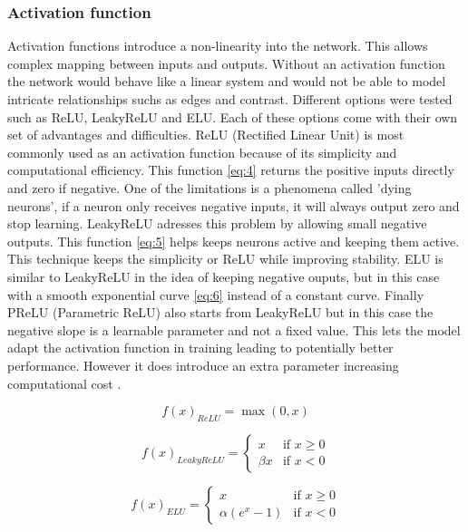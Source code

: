 \documentclass[twocolumn]{article}
\begin{document}
\subsubsection{Activation function}
Activation functions introduce a non-linearity into the network. This allows complex mapping between inputs and outputs. 
Without an activation function the network would behave like a linear system and would not be able to model intricate relationships suchs as edges and contrast. 
Different options were tested such as ReLU,  LeakyReLU and ELU. Each of these options come with their own set of advantages and difficulties. 
ReLU (Rectified Linear Unit) is most commonly used as an activation function because of its simplicity and computational efficiency. 
This function \ref{eq:4} returns the positive inputs directly and zero if negative. One of the limitations is a phenomena called 'dying neurons',  if a neuron only receives negative inputs, it will always output zero and stop learning.
LeakyReLU adresses this problem by allowing small negative outputs. This function \ref{eq:5} helps keeps neurons active and keeping them active. 
This technique keeps the simplicity or ReLU while improving stability. 
ELU is similar to LeakyReLU in the idea of keeping negative ouputs, but in this case with a smooth exponential curve \ref{eq:6}  instead of a constant curve. 
Finally PReLU (Parametric ReLU) also starts from LeakyReLU but in this case the negative slope is a learnable parameter and not a fixed value. 
This lets the model adapt the activation function in training leading to potentially better performance. 
However it does introduce an extra parameter increasing computational cost \cite{bharatiya_2019_comprehensive}.

\begin{equation}\label{eq:4}
    f(x)_{ReLU} = \max(0, x)
\end{equation}

\begin{equation}\label{eq:5}
f(x)_{LeakyReLU} = 
\begin{cases}
x & \text{if } x \geq 0 \\
\beta x & \text{if } x < 0
\end{cases}
\end{equation}

\begin{equation}\label{eq:6}
f(x)_{ELU} = 
\begin{cases}
x & \text{if } x \geq 0 \\
\alpha (e^x - 1) & \text{if } x < 0
\end{cases}
\end{equation}
\end{document}

